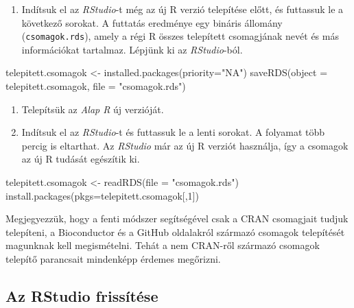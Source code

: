 \documentclass[
]{book}
\newenvironment{Shaded}{\begin{snugshade}}{\end{snugshade}}
\newcommand{\AttributeTok}[1]{\textcolor[rgb]{0.77,0.63,0.00}{#1}}
\newcommand{\DecValTok}[1]{\textcolor[rgb]{0.00,0.00,0.81}{#1}}
\newcommand{\FunctionTok}[1]{\textcolor[rgb]{0.00,0.00,0.00}{#1}}
\newcommand{\NormalTok}[1]{#1}
\newcommand{\OtherTok}[1]{\textcolor[rgb]{0.56,0.35,0.01}{#1}}
\newcommand{\StringTok}[1]{\textcolor[rgb]{0.31,0.60,0.02}{#1}}
\providecommand{\tightlist}{%
  \setlength{\itemsep}{0pt}\setlength{\parskip}{0pt}}
\begin{document}
\begin{enumerate}
\def\labelenumi{\arabic{enumi}.}
\tightlist
\item
  Indítsuk el az \emph{RStudio}-t még az új R verzió telepítése előtt, és futtassuk le a következő sorokat. A futtatás eredménye egy bináris állomány (\texttt{csomagok.rds}), amely a régi R összes telepített csomagjának nevét és más információkat tartalmaz. Lépjünk ki az \emph{RStudio}-ból.
\end{enumerate}

\begin{Shaded}
\begin{Highlighting}[]
\NormalTok{telepitett.csomagok }\OtherTok{\textless{}{-}} \FunctionTok{installed.packages}\NormalTok{(}\AttributeTok{priority=}\StringTok{"NA"}\NormalTok{)}
\FunctionTok{saveRDS}\NormalTok{(}\AttributeTok{object =}\NormalTok{ telepitett.csomagok, }\AttributeTok{file =} \StringTok{"csomagok.rds"}\NormalTok{)}
\end{Highlighting}
\end{Shaded}

\begin{enumerate}
\def\labelenumi{\arabic{enumi}.}
\setcounter{enumi}{1}
\item
  Telepítsük az \emph{Alap R} új verzióját.
\item
  Indítsuk el az \emph{RStudio}-t és futtassuk le a lenti sorokat. A folyamat több percig is eltarthat. Az \emph{RStudio} már az új R verziót használja, így a csomagok az új R tudását egészítik ki.
\end{enumerate}

\begin{Shaded}
\begin{Highlighting}[]
\NormalTok{telepitett.csomagok }\OtherTok{\textless{}{-}} \FunctionTok{readRDS}\NormalTok{(}\AttributeTok{file =} \StringTok{"csomagok.rds"}\NormalTok{)}
\FunctionTok{install.packages}\NormalTok{(}\AttributeTok{pkgs=}\NormalTok{telepitett.csomagok[,}\DecValTok{1}\NormalTok{])}
\end{Highlighting}
\end{Shaded}

Megjegyezzük, hogy a fenti módszer segítségével csak a CRAN csomagjait tudjuk telepíteni, a Bioconductor és a GitHub oldalakról származó csomagok telepítését magunknak kell megismételni. Tehát a nem CRAN-ről származó csomagok telepítő parancsait mindenképp érdemes megőrizni.

\hypertarget{az-rstudio-frissuxedtuxe9se}{%
\subsection{Az RStudio frissítése}\label{az-rstudio-frissuxedtuxe9se}}
\end{document}
